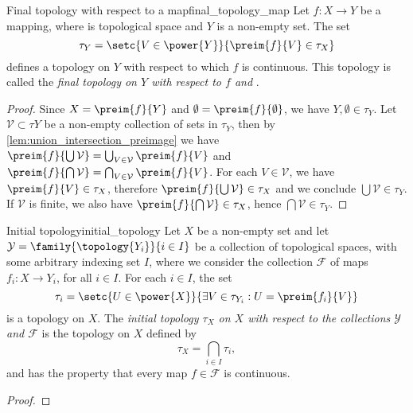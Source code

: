 \begin{proposition}{Final topology with respect to a map}{final_topology_map}
    Let \(f : X \to Y\) be a mapping, where  is topological space and \(Y\) is a non-empty set. The set
    \begin{equation*}
        \tau_Y = \setc{V \in \power{Y}}{\preim{f}{V} \in \tau_X}
    \end{equation*}
    defines a topology on \(Y\) with respect to which \(f\) is continuous. This topology is called the \emph{final topology on \(Y\) with respect to \(f\) and }.
\end{proposition}
\begin{proof}
    Since \(X = \preim{f}{Y}\) and \(\emptyset = \preim{f}{\emptyset}\), we have \(Y,\emptyset \in \tau_Y\). Let \(\mathcal{V} \subset \tau{Y}\) be a non-empty collection of sets in \(\tau_Y\), then by \cref{lem:union_intersection_preimage} we have \(\preim{f}{\bigcup \mathcal{V}}= \bigcup_{V \in \mathcal{V}}\preim{f}{V}\) and \(\preim{f}{\bigcap \mathcal{V}} = \bigcap_{V \in \mathcal{V}} \preim{f}{V}\). For each \(V \in \mathcal{V}\), we have \(\preim{f}{V} \in \tau_X\), therefore \(\preim{f}{\bigcup \mathcal{V}} \in \tau_X\) and we conclude \(\bigcup \mathcal{V} \in \tau_Y\). If \(\mathcal{V}\) is finite, we also have \(\preim{f}{\bigcap \mathcal{V}} \in \tau_X\), hence \(\bigcap \mathcal{V} \in \tau_Y\).
\end{proof}

\begin{proposition}{Initial topology}{initial_topology}
    Let \(X\) be a non-empty set and let \(\mathcal{Y} = \family{\topology{Y_i}}{i\in I}\) be a collection of topological spaces, with some arbitrary indexing set \(I\), where we consider the collection \(\mathcal{F}\) of maps \(f_i : X \to Y_i\), for all \(i \in I\). For each \(i \in I\), the set
    \begin{equation*}
        \tau_{i} = \setc{U \in \power{X}}{\exists V \in \tau_{Y_i} : U = \preim{f_i}{V}}
    \end{equation*}
    is a topology on \(X\). The \emph{initial topology \(\tau_X\) on \(X\) with respect to the collections \(\mathcal{Y}\) and \(\mathcal{F}\)} is the topology on \(X\) defined by
    \begin{equation*}
        \tau_X = \bigcap_{i \in I} \tau_i,
    \end{equation*}
    and has the property that every map \(f \in \mathcal{F}\) is continuous.
\end{proposition}
\begin{proof}
\end{proof}

